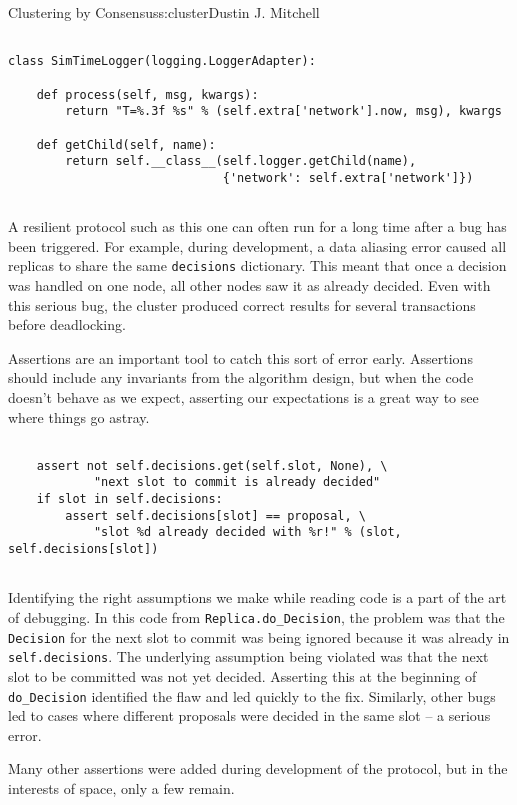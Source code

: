 \begin{aosachapter}{Clustering by Consensus}{s:cluster}{Dustin J. Mitchell}
\begin{verbatim}

class SimTimeLogger(logging.LoggerAdapter):

    def process(self, msg, kwargs):
        return "T=%.3f %s" % (self.extra['network'].now, msg), kwargs

    def getChild(self, name):
        return self.__class__(self.logger.getChild(name),
                              {'network': self.extra['network']})
    
\end{verbatim}

A resilient protocol such as this one can often run for a long time
after a bug has been triggered. For example, during development, a data
aliasing error caused all replicas to share the same \texttt{decisions}
dictionary. This meant that once a decision was handled on one node, all
other nodes saw it as already decided. Even with this serious bug, the
cluster produced correct results for several transactions before
deadlocking.

Assertions are an important tool to catch this sort of error early.
Assertions should include any invariants from the algorithm design, but
when the code doesn't behave as we expect, asserting our expectations is
a great way to see where things go astray.

\begin{verbatim}

    assert not self.decisions.get(self.slot, None), \
            "next slot to commit is already decided"
    if slot in self.decisions:
        assert self.decisions[slot] == proposal, \
            "slot %d already decided with %r!" % (slot, self.decisions[slot])
    
\end{verbatim}

Identifying the right assumptions we make while reading code is a part
of the art of debugging. In this code from
\texttt{Replica.do\_Decision}, the problem was that the
\texttt{Decision} for the next slot to commit was being ignored because
it was already in \texttt{self.decisions}. The underlying assumption
being violated was that the next slot to be committed was not yet
decided. Asserting this at the beginning of \texttt{do\_Decision}
identified the flaw and led quickly to the fix. Similarly, other bugs
led to cases where different proposals were decided in the same slot --
a serious error.

Many other assertions were added during development of the protocol, but
in the interests of space, only a few remain.


\end{aosachapter}
